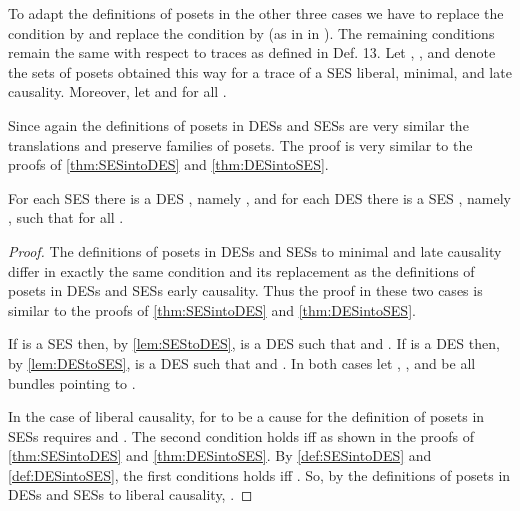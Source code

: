 \documentclass[runningheads,a4paper]{llncs}
\begin{document}
To adapt the definitions of posets in the other three cases we have to replace
the condition  by  and replace the condition  by  (as in  in \cite{dynamicCausality15}). The remaining conditions remain the same with respect to traces as defined in Def. 13.
Let , , and  denote the sets of posets obtained this way for a trace  of a SES  \wrt liberal, minimal, and late causality. Moreover, let  and  for all .

Since again the definitions of posets in DESs and SESs are very similar the translations  and  preserve families of posets. The proof is very similar to the proofs of \ths\ref{thm:SESintoDES} and \ref{thm:DESintoSES}.

\begin{theorem}
	For each SES  there is a DES , namely , and for each DES  there is a SES , namely , such that  for all .
\end{theorem}

\begin{proof}
	The definitions of posets in DESs and SESs \wrt to minimal and late causality
	differ in exactly the same condition and its replacement as the definitions of
	posets in DESs and SESs \wrt early causality. Thus the proof in these two cases is similar to the proofs of \ths\ref{thm:SESintoDES} and \ref{thm:DESintoSES}.
	
	If  is a SES then, by \lem\ref{lem:SEStoDES},  is a DES such that  and .
	If  is a DES then, by \lem\ref{lem:DEStoSES},  is a DES such that  and .
	In both cases let , , and  be all bundles pointing to .
	
	In the case of liberal causality, for  to be a cause for  the
	definition of posets in SESs requires  and .
	The second condition holds iff  as shown in the proofs of \ths\ref{thm:SESintoDES} and \ref{thm:DESintoSES}.
	By \ref{def:SESintoDES} and \ref{def:DESintoSES}, the first conditions holds iff .
	So, by the definitions of posets in DESs and SESs \wrt to liberal causality, .
\end{proof}
\end{document}
